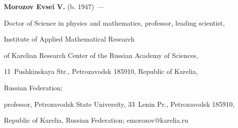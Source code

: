 \textbf{Morozov Evsei V.} (b. 1947)~--- 


Doctor of Science in physics and mathematics, professor, leading scientist, 


Institute of Applied Mathematical Research


of Karelian Research Center of the Russian Academy of Sciences, 


11~Pushkinskaya Str., Petrozavodsk 185910, Republic of Karelia, 


Russian Federation; 


professor, Petrozavodsk State University, 33~Lenin Pr., Petrozavodsk 185910, 


Republic of Karelia, Russian Federation; \mbox{emorozov@karelia.ru}





 


\label{end\stat}








\renewcommand{\bibname}{\protect\rm Литература}


